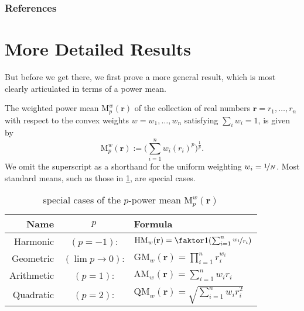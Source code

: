 \documentclass[twoside]{article}
\theoremstyle{plain}
\theoremstyle{definition}
\begin{document}
\subsubsection*{References}






\clearpage
\onecolumn
\appendix

\section{More Detailed Results}
But before we get there, we first prove a more general result, which is most clearly articulated in terms of a power mean.

\begin{defn}%
	The weighted power mean $\mathrm M^w_p(\mathbf r)$ of the collection of real numbers $\mathbf r = r_1, \ldots, r_n$ with respect to the convex weights $w = w_1, \ldots, w_n$ satisfying $\sum_iw_i = 1$, is given by
	\[ \mathrm M^w_p(\mathbf r) := \Big(\sum_{i=1}^n w_i (r_i)^p \Big)^{\frac1p}.\]
	We omit the superscript as a shorthand for the uniform weighting $w_i = \nicefrac{1}{N}$.
	Most standard means, such as those in \cref{tab:power-means}, are special cases.
\end{defn}

\begin{table}
\centering
\renewcommand{\arraystretch}{1.5} %
\begin{tabular}{rcl}
	\textbf{Name} & $p$ & \textbf{Formula}\\\hline
	Harmonic&$(p=-1)$:& $\mathrm{HM}_w(\mathbf r) = \faktor1{\left(\sum_{i=1}^n \nicefrac{w_i}{r_i}\right)}$ \\
	Geometric&$(\lim {p\to 0})$:& $\mathrm{GM}_w(\mathbf r) = \prod_{i=1}^n r_i^{w_i}$ \\
	Arithmetic&$(p=1)$:& $\mathrm{AM}_w(\mathbf r) = \sum_{i=1}^n w_i r_i$ \\
	Quadratic&$(p=2)$:& $\mathrm{QM}_w(\mathbf r) = \sqrt{\textstyle\sum_{i=1}^n w_i r_i^2}$\\\hline
	\end{tabular}
	\caption{special cases of the $p$-power mean $\mathrm M_p^w(\mathbf r)$}
	\label{tab:power-means}
\end{table}
\end{document}
